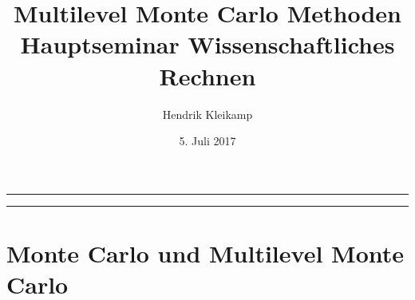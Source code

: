 \documentclass[10pt,a4paper]{article}
\title{Multilevel Monte Carlo Methoden\\
\small{Hauptseminar Wissenschaftliches Rechnen}}
\author{Hendrik Kleikamp}
\date{5. Juli 2017}
\begin{document}

\maketitle

\vspace{-1cm}
\begin{center}
	\rule{0.8\textwidth}{.4pt}
\end{center}
\hrule

\section{Monte Carlo und Multilevel Monte Carlo}
\end{document}
